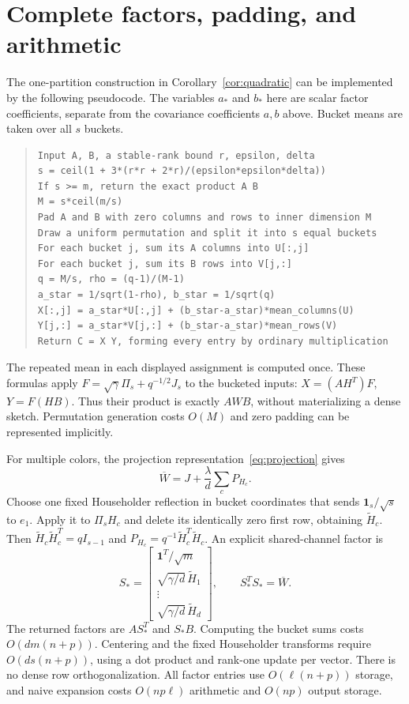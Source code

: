 \documentclass[11pt]{article}
\begin{document}
\section{Complete factors, padding, and arithmetic}\label{sec:cost}
The one-partition construction in Corollary~\ref{cor:quadratic} can be
implemented by the following pseudocode. The variables $a_*$ and $b_*$
here are scalar factor coefficients, separate from the covariance
coefficients $a,b$ above. Bucket means are taken over all $s$ buckets.
\begin{quote}\small
\begin{verbatim}
Input A, B, a stable-rank bound r, epsilon, delta
s = ceil(1 + 3*(r*r + 2*r)/(epsilon*epsilon*delta))
If s >= m, return the exact product A B
M = s*ceil(m/s)
Pad A and B with zero columns and rows to inner dimension M
Draw a uniform permutation and split it into s equal buckets
For each bucket j, sum its A columns into U[:,j]
For each bucket j, sum its B rows into V[j,:]
q = M/s, rho = (q-1)/(M-1)
a_star = 1/sqrt(1-rho), b_star = 1/sqrt(q)
X[:,j] = a_star*U[:,j] + (b_star-a_star)*mean_columns(U)
Y[j,:] = a_star*V[j,:] + (b_star-a_star)*mean_rows(V)
Return C = X Y, forming every entry by ordinary multiplication
\end{verbatim}
\end{quote}
The repeated mean in each displayed assignment is computed once.
These formulas apply $F=\sqrt\gamma\Pi_s+q^{-1/2}J_s$ to the bucketed
inputs: $X=(AH^T)F$, $Y=F(HB)$. Thus their product is exactly $AWB$,
without materializing a dense sketch. Permutation generation costs
$O(M)$ and zero padding can be represented implicitly.

For multiple colors, the projection representation~\eqref{eq:projection} gives
\[
 \overline W=J+\frac\lambda d\sum_cP_{H_c}.
\]
Choose one fixed Householder reflection in bucket coordinates that sends
$\mathbf1_s/\sqrt s$ to $e_1$. Apply it to $\Pi_sH_c$ and delete its
identically zero first row, obtaining $\widetilde H_c$. Then
$\widetilde H_c\widetilde H_c^T=qI_{s-1}$ and
$P_{H_c}=q^{-1}\widetilde H_c^T\widetilde H_c$.
An explicit shared-channel factor is
\[
 S_*=
 \begin{bmatrix}
  \mathbf1^T/\sqrt m\\
  \sqrt{\gamma/d}\,\widetilde H_1\\
  \vdots\\
  \sqrt{\gamma/d}\,\widetilde H_d
 \end{bmatrix},\qquad S_*^TS_*=\overline W.
\]
The returned factors are $AS_*^T$ and $S_*B$.
Computing the bucket sums costs $O(dm(n+p))$. Centering and the fixed
Householder transforms require $O(ds(n+p))$, using a dot product and
rank-one update per vector. There is no dense row orthogonalization.
All factor entries use $O(\ell(n+p))$ storage, and naive expansion costs
$O(np\ell)$ arithmetic and $O(np)$ output storage.
\end{document}
